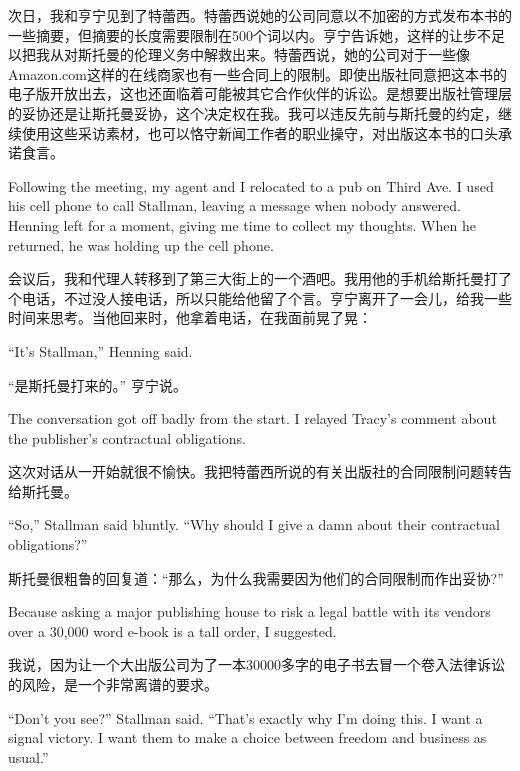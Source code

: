 \ifdefined\chs
次日，我和亨宁见到了特蕾西。特蕾西说她的公司同意以不加密的方式发布本书的一些摘要，但摘要的长度需要限制在500个词以内。亨宁告诉她，这样的让步不足以把我从对斯托曼的伦理义务中解救出来。特蕾西说，她的公司对于一些像Amazon.com这样的在线商家也有一些合同上的限制。即使出版社同意把这本书的电子版开放出去，这也还面临着可能被其它合作伙伴的诉讼。是想要出版社管理层的妥协还是让斯托曼妥协，这个决定权在我。我可以违反先前与斯托曼的约定，继续使用这些采访素材，也可以恪守新闻工作者的职业操守，对出版这本书的口头承诺食言。
\fi

\ifdefined\eng
Following the meeting, my agent and I relocated to a pub on Third Ave. I used his cell phone to call Stallman, leaving a message when nobody answered. Henning left for a moment, giving me time to collect my thoughts. When he returned, he was holding up the cell phone.
\fi

\ifdefined\chs
会议后，我和代理人转移到了第三大街上的一个酒吧。我用他的手机给斯托曼打了个电话，不过没人接电话，所以只能给他留了个言。亨宁离开了一会儿，给我一些时间来思考。当他回来时，他拿着电话，在我面前晃了晃：
\fi

\ifdefined\eng
``It's Stallman,'' Henning said.
\fi

\ifdefined\chs
“是斯托曼打来的。” 亨宁说。
\fi

\ifdefined\eng
The conversation got off badly from the start. I relayed Tracy's comment about the publisher's contractual obligations.
\fi

\ifdefined\chs
这次对话从一开始就很不愉快。我把特蕾西所说的有关出版社的合同限制问题转告给斯托曼。
\fi

\ifdefined\eng
``So,'' Stallman said bluntly. ``Why should I give a damn about their contractual obligations?''
\fi

\ifdefined\chs
斯托曼很粗鲁的回复道：“那么，为什么我需要因为他们的合同限制而作出妥协?”
\fi

\ifdefined\eng
Because asking a major publishing house to risk a legal battle with its vendors over a 30,000 word e-book is a tall order, I suggested. %
\fi

\ifdefined\chs
我说，因为让一个大出版公司为了一本30000多字的电子书去冒一个卷入法律诉讼的风险，是一个非常离谱的要求。%
\fi

\ifdefined\eng
``Don't you see?'' Stallman said. ``That's exactly why I'm doing this. I want a signal victory. I want them to make a choice between freedom and business as usual.''
\fi


